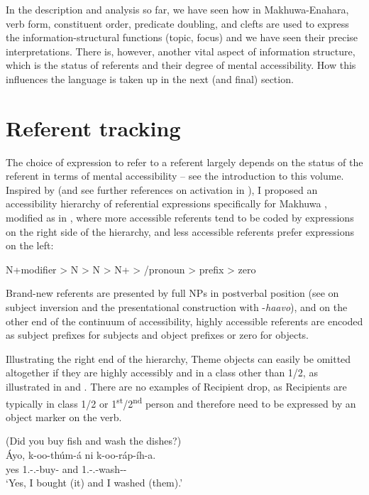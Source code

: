 \documentclass[output=paper]{langscibook}
\begin{document}
In the description and analysis so far, we have seen how in Makhuwa-Enahara, verb form, constituent order, predicate doubling, and clefts are used to express the information-structural functions (topic, focus) and we have seen their precise interpretations. There is, however, another vital aspect of information structure, which is the status of referents and their degree of mental accessibility. How this influences the language is taken up in the next (and final) section.

\section{Referent tracking}
\label{bkm:Ref117578879}
The choice of expression to refer to a referent largely depends on the status of the referent in terms of mental accessibility – see the introduction to this volume. Inspired by \citet{Ariel1990,Ariel2001} (and see further references on activation in \cite{chapters/intro}), I proposed an accessibility hierarchy of referential expressions specifically for Makhuwa \citep[195]{vanderWal2010}, modified as in , where more accessible referents tend to be coded by expressions on the right side of the hierarchy, and less accessible referents prefer expressions on the left:

\ea
\label{bkm:Ref110501885}
N+modifier > N > \DEM{} N \DEM{} > N+\DEM{} > \DEM{}/pronoun > prefix > zero
\z

Brand-new referents are presented by full NPs in postverbal position (see  on subject inversion and the presentational construction with \nobreakdash-\textit{haavo}), and on the other end of the continuum of accessibility, highly accessible referents are encoded as subject prefixes for subjects and object prefixes or zero for objects. 

Illustrating the right end of the hierarchy, Theme objects can easily be omitted altogether if they are highly accessibly and in a class other than 1/2, as illustrated in  and . There are no examples of Recipient drop, as Recipients are typically in class 1/2 or 1\textsuperscript{st}/2\textsuperscript{nd} person and therefore need to be expressed by an object marker on the verb.

\ea
\label{bkm:Ref110500117}
(Did you buy fish and wash the dishes?)\\
\gll
Áyo,  k{}-oo{}-thúm{}-á  ni  k{}-oo{}-ráp{}-íh{}-a.\\
yes  1\SG{}.\SM{}-\PFV{}.\DJ{}-buy-\FV{}  and  1\SG{}.\SM{}-\PFV{}.\DJ{}-wash-\CAUS{}-\FV{}\\
\glt
‘Yes, I bought (it) and I washed (them).’\\
\end{document}

